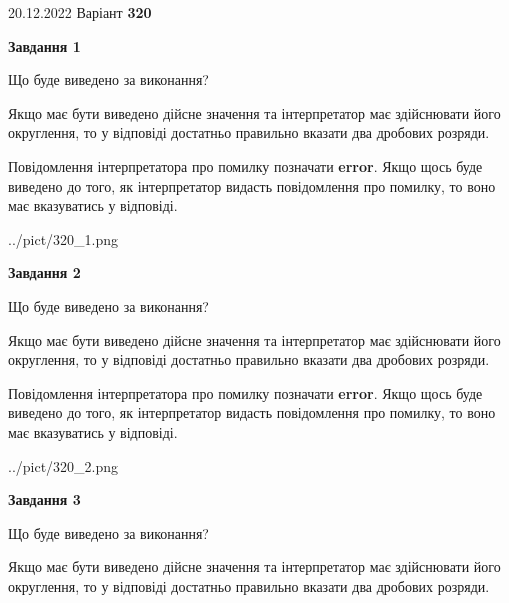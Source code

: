 \documentclass[12pt, ukrainian]{article}
\begin{document}
{20.12.2022 Варіант \No \textbf { 320 }\par}
{
\begin {Large}

{\begin {center}\textbf{Завдання 1}\end {center}}\par
Що буде виведено за виконання? \par

Якщо має бути виведено дійсне значення та інтерпретатор має здійснювати його округлення, 
то у відповіді достатньо правильно вказати два дробових розряди.

Повідомлення інтерпретатора про помилку позначати \textbf{error}.
Якщо щось буде виведено до того, як інтерпретатор видасть повідомлення про помилку, 
то воно має вказуватись у відповіді. \par

\begin{center}
	{../pict/320_1.png}
\end{center}
\newpage

{\begin {center}\textbf{Завдання 2}\end {center}}\par
Що буде виведено за виконання? \par

Якщо має бути виведено дійсне значення та інтерпретатор має здійснювати його округлення, 
то у відповіді достатньо правильно вказати два дробових розряди.

Повідомлення інтерпретатора про помилку позначати \textbf{error}.
Якщо щось буде виведено до того, як інтерпретатор видасть повідомлення про помилку, 
то воно має вказуватись у відповіді. \par

\begin{center}
	{../pict/320_2.png}
\end{center}
\newpage

{\begin {center}\textbf{Завдання 3}\end {center}}\par
Що буде виведено за виконання? \par

Якщо має бути виведено дійсне значення та інтерпретатор має здійснювати його округлення, 
то у відповіді достатньо правильно вказати два дробових розряди.


\end{Large}}
\end{document}

